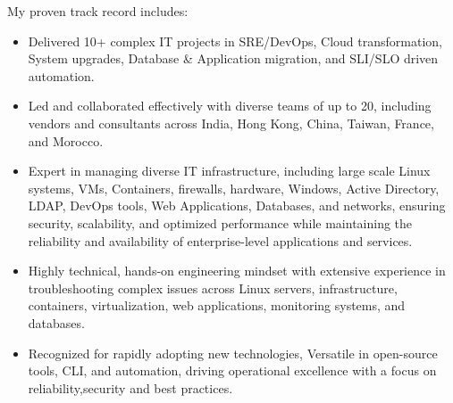 \documentclass[11pt]{article}
\begin{document}
	My proven track record includes:
	\begin{itemize}
		\item Delivered 10+ complex IT projects in SRE/DevOps, Cloud transformation, System upgrades, Database \& Application migration, and SLI/SLO driven automation.
		\item Led and collaborated effectively with diverse teams of up to 20, including vendors and consultants across India, Hong Kong, China, Taiwan, France, and Morocco. 
		\item Expert in managing diverse IT infrastructure, including large scale Linux systems, VMs, Containers, firewalls, hardware, Windows, Active Directory, LDAP, DevOps tools, Web Applications, Databases, and networks, ensuring security, scalability, and optimized performance while maintaining the reliability and availability of enterprise-level applications and services.
		
		\item Highly technical, hands-on engineering mindset with extensive experience in troubleshooting complex issues across Linux servers, infrastructure, containers, virtualization, web applications, monitoring systems, and databases.
		\item Recognized for rapidly adopting new technologies, Versatile in open-source tools, CLI, and automation, driving operational excellence with a focus on reliability,security and best practices.
	\end{itemize}
	\vspace{-1.8em}
\end{document}
